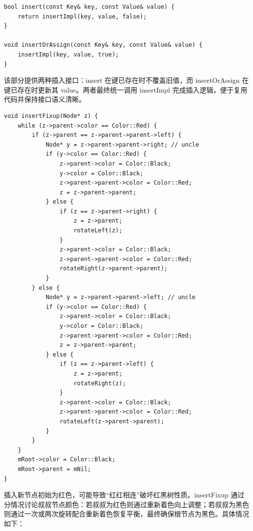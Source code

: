 \documentclass[UTF8,12pt,a4paper]{ctexart}
\begin{document}
\begin{lstlisting}[caption={红黑树插入接口（insert / insertOrAssign）}]
bool insert(const Key& key, const Value& value) {
    return insertImpl(key, value, false);
}

void insertOrAssign(const Key& key, const Value& value) {
    insertImpl(key, value, true);
}
\end{lstlisting}

该部分提供两种插入接口：insert 在键已存在时不覆盖旧值，而 insertOrAssign 在键已存在时更新其 value。两者最终统一调用 insertImpl 完成插入逻辑，便于复用代码并保持接口语义清晰。

\vspace{1em}

\begin{lstlisting}[caption={红黑树插入后的平衡维护（insertFixup）}]
void insertFixup(Node* z) {
    while (z->parent->color == Color::Red) {
        if (z->parent == z->parent->parent->left) {
            Node* y = z->parent->parent->right; // uncle
            if (y->color == Color::Red) {
                z->parent->color = Color::Black;
                y->color = Color::Black;
                z->parent->parent->color = Color::Red;
                z = z->parent->parent;
            } else {
                if (z == z->parent->right) {
                    z = z->parent;
                    rotateLeft(z);
                }
                z->parent->color = Color::Black;
                z->parent->parent->color = Color::Red;
                rotateRight(z->parent->parent);
            }
        } else {
            Node* y = z->parent->parent->left; // uncle
            if (y->color == Color::Red) {
                z->parent->color = Color::Black;
                y->color = Color::Black;
                z->parent->parent->color = Color::Red;
                z = z->parent->parent;
            } else {
                if (z == z->parent->left) {
                    z = z->parent;
                    rotateRight(z);
                }
                z->parent->color = Color::Black;
                z->parent->parent->color = Color::Red;
                rotateLeft(z->parent->parent);
            }
        }
    }
    mRoot->color = Color::Black;
    mRoot->parent = mNil;
}
\end{lstlisting}

插入新节点初始为红色，可能导致“红红相连”破坏红黑树性质。insertFixup 通过分情况讨论叔叔节点颜色：若叔叔为红色则通过重新着色向上调整；若叔叔为黑色则通过一次或两次旋转配合重新着色恢复平衡，最终确保根节点为黑色。具体情况如下：
\end{document}
